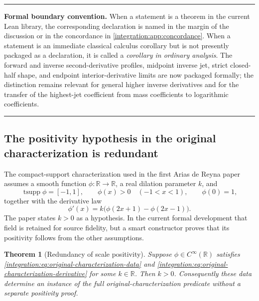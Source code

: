 \documentclass[11pt,oneside]{article}
\newtheorem{theorem}{Theorem}[section]
\theoremstyle{definition}
\theoremstyle{remark}
\newcommand{\R}{\mathbb R}
\newenvironment{boxedremark}{%
  \par\smallskip\noindent\begin{center}\begin{minipage}{0.94\textwidth}%
  \color{black}\hrule\vspace{0.6em}\small
}{%
  \vspace{0.6em}\hrule\end{minipage}\end{center}\smallskip
}
\begin{document}
\begin{boxedremark}
\textbf{Formal boundary convention.}  When a statement is a theorem in the current Lean
library, the corresponding declaration is named in the margin of the discussion or in the
concordance in \cref{integration:app:concordance}.  When a statement is an immediate classical calculus
corollary but is not presently packaged as a declaration, it is called a \emph{corollary in
ordinary analysis}.  The forward and inverse second-derivative profiles, midpoint inverse
jet, strict closed-half shape, and endpoint interior-derivative limits are now packaged
formally; the distinction remains relevant for general higher inverse
derivatives and for the transfer of the highest-jet coefficient from mass coefficients to
logarithmic coefficients.
\end{boxedremark}

\subsection{The positivity hypothesis in the original characterization is redundant}
\label{integration:sec:scale-positive}

The compact-support characterization used in the first Arias de Reyna paper
\cite{integration:arias05442} assumes a smooth function $\phi:\R\to\R$, a real dilation
parameter $k$, and
\begin{equation}
 \operatorname{tsupp}\phi=[-1,1],\qquad
 \phi(x)>0\quad(-1<x<1),\qquad
 \phi(0)=1,
 \label{integration:eq:original-characterization-data}
\end{equation}
together with the derivative law
\begin{equation}
 \phi'(x)=k\bigl(\phi(2x+1)-\phi(2x-1)\bigr).
 \label{integration:eq:original-characterization-derivative}
\end{equation}
The paper states $k>0$ as a hypothesis.  In the current formal development that field is retained
for source fidelity, but a smart constructor proves that its positivity follows from the other
assumptions.

\begin{theorem}[Redundancy of scale positivity]
\label{integration:thm:scale-positive-redundant}
Suppose $\phi\in C^\infty(\R)$ satisfies
\eqref{integration:eq:original-characterization-data} and
\eqref{integration:eq:original-characterization-derivative} for some $k\in\R$.  Then $k>0$.
Consequently these data determine an instance of the full original-characterization predicate
without a separate positivity proof.
\end{theorem}
\end{document}
